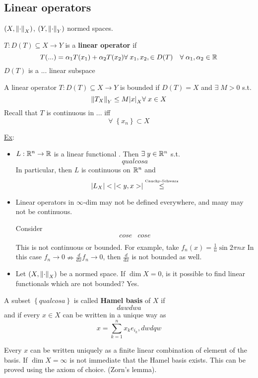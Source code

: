 \subsection*{Linear operators}
\((X, \norm{\cdot}_X)\), \((Y, \norm{\cdot}_Y)\) normed spaces.
\begin{definition}
    \(T : D(T) \subseteq X \to Y\) is a \textbf{linear operator} if 
    \[
        T(...) = \alpha_1 T(x_1) + \alpha_2 T(x_2) \forall \; x_1, x_2, \in D(T) \quad \forall \; \alpha_1, \alpha_2 \in \mathbb{R}
    \]
    \(D(T)\) is a ... linear subspace
\end{definition}
\begin{definition}
    A linear operator \(T : D(T) \subseteq X \to Y\) is bounded if \(D(T) = X\) and \(\exists \; M >0\) s.t. 
    \[
        \norm{T_X}_Y \leq M \abs{x}_X \forall \; x \in X
    \]
    Recall that \(T\) is continuous in ... iff 
    \[
        \forall \; \left\{ x_n \right\} \subset X
    \]
\end{definition}
\underline{Ex}:
\begin{itemize}
    \item \(L: \mathbb{R}^n \to \mathbb{R}\)  is a linear functional . Then \(\exists \; y \in \mathbb{R}^n\) s.t. 
    \[
        qualcosa
    \]
    In particular, then \(L\) is continuous on \(\mathbb{R}^n\) and 
    \[
        \abs{L_X} < \abs{<y,x>} \overset{\text{\tiny{Cauchy-Schwarz}}}{\leq}
    \]
    \item Linear operators in \(\infty\)-dim may not be defined everywhere, and many may not be continuous.
    
    Consider 
    \[
        \begin{array}{cc}
            cose & cose \\
        \end{array}
    \]
    This is not continuous or bounded. For example, take \(f_n(x) = \frac{1}{n} \sin{2\pi n x}\)
    In this case \(f_n \to 0 \nRightarrow \frac{d}{dx} f_n \to 0\), then \(\frac{d}{dx}\) is not bounded as well.
    \item Let \((X, \norm{\cdot}_X)\) be a normed space. If \(\dim X = 0\), is it possible to find linear functionals which are not bounded? Yes.
\end{itemize}
\begin{definition}
    A subset \(\left\{ qualcosa \right\}\) is called \textbf{Hamel basis} of \(X\) if 
    \[
        dawdwa
    \]
    and if every \(x \in X\) can be written in a unique way as 
    \[
        x = \sum_{k=1}^n x_k e_{i_k}, dwdqw
    \]
\end{definition}
Every \(x\) can be written uniquely as a finite linear combination of element of the basis.
If \(\dim X = \infty\) is not immediate that the Hamel basis exists. This can be proved using the axiom of choice. (Zorn's lemma). 

